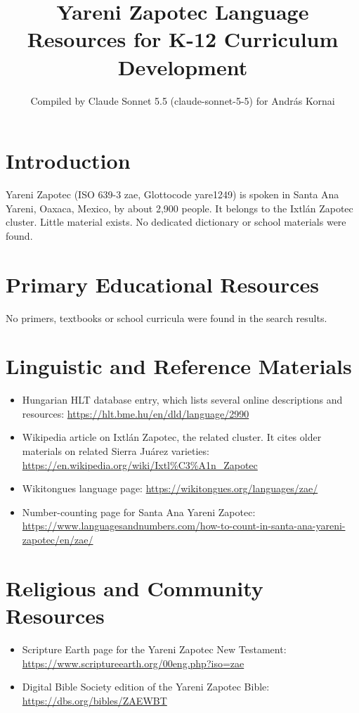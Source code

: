\documentclass[12pt]{article}
\title{Yareni Zapotec Language Resources for K-12 Curriculum Development}
\author{Compiled by Claude Sonnet 5.5 (claude-sonnet-5-5) for Andr\'as Kornai}
\date{}
\begin{document}
\maketitle

\section{Introduction}
Yareni Zapotec (ISO 639-3 zae, Glottocode yare1249) is spoken in Santa Ana Yareni, Oaxaca, Mexico, by about 2,900 people. It belongs to the Ixtl\'an Zapotec cluster. Little material exists. No dedicated dictionary or school materials were found.

\section{Primary Educational Resources}
No primers, textbooks or school curricula were found in the search results.

\section{Linguistic and Reference Materials}
\begin{itemize}
\item Hungarian HLT database entry, which lists several online descriptions and resources: \url{https://hlt.bme.hu/en/dld/language/2990}
\item Wikipedia article on Ixtl\'an Zapotec, the related cluster. It cites older materials on related Sierra Ju\'arez varieties: \url{https://en.wikipedia.org/wiki/Ixtl%C3%A1n_Zapotec}
\item Wikitongues language page: \url{https://wikitongues.org/languages/zae/}
\item Number-counting page for Santa Ana Yareni Zapotec: \url{https://www.languagesandnumbers.com/how-to-count-in-santa-ana-yareni-zapotec/en/zae/}
\end{itemize}

\section{Religious and Community Resources}
\begin{itemize}
\item Scripture Earth page for the Yareni Zapotec New Testament: \url{https://www.scriptureearth.org/00eng.php?iso=zae}
\item Digital Bible Society edition of the Yareni Zapotec Bible: \url{https://dbs.org/bibles/ZAEWBT}
\end{itemize}
\end{document}
